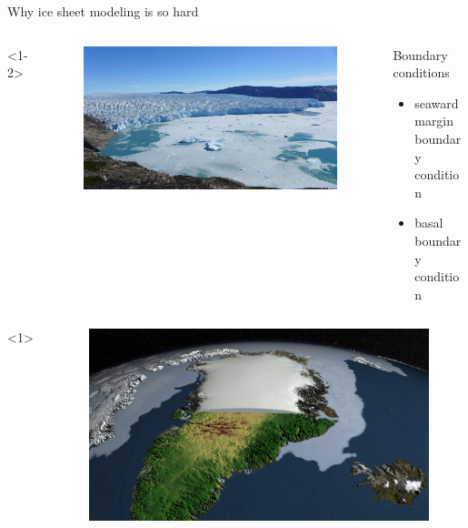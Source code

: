 \documentclass[hide notes,intlimits]{beamer}
\begin{document}
\begin{frame}{Why ice sheet modeling is so hard}
    \begin{columns}[c]<1-2>
      \begin{column}{.28\linewidth}
        \begin{figure}
          \includegraphics[width=\linewidth]{storeglacier}
        \end{figure}
      \end{column}
      \begin{column}{.67\linewidth}
        \begin{block}{Boundary conditions}
        \begin{itemize}
        \item seaward margin boundary condition
        \item basal boundary condition
        \end{itemize}
      \end{block}
      \end{column}
    \end{columns}
    \begin{columns}[c]<1>
      \begin{column}{.28\linewidth}
        \begin{figure}
          \includegraphics[width=\linewidth]{canale_grande_V05}

\end{figure}
\end{column}
\end{columns}
\end{frame}
\end{document}
